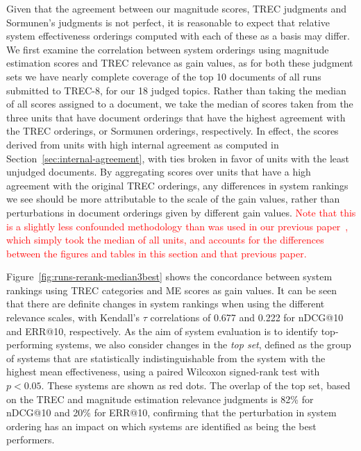Given that the agreement between our magnitude scores, TREC judgments
and Sormunen's judgments is not perfect, it is reasonable to expect
that relative system effectiveness orderings computed with each of
these as a basis may differ.
We first examine the correlation between system orderings using
magnitude estimation scores and TREC relevance as gain values, as for
both these judgment sets we have nearly complete coverage of the top 10
documents of all runs submitted to TREC-8, for our 18 judged topics.
% 
Rather than taking the median of all scores assigned to a document, we
take the median of scores taken from the three units that have document
orderings that have the highest agreement with the TREC orderings, or
Sormunen orderings, respectively.
In effect, the scores derived from units with high internal agreement as
computed in Section~\ref{sec:internal-agreement}, with ties broken in favor
of units with the least unjudged documents.
By aggregating scores over units that have a high agreement with the
original TREC orderings, any differences in system rankings we see should be more
attributable to the scale of the gain values, rather than perturbations in
document orderings given by different gain values.
\textcolor{red}{Note that this is a slightly less confounded methodology 
than was used in our previous paper~\cite{ME-SIGIR15}, which simply took the median 
of all units, and accounts for the 
differences between the figures and tables in this section and 
that previous paper.}

Figure~\ref{fig:runs-rerank-median3best} shows the concordance between
system rankings using TREC categories and ME scores as gain values.
It can be seen that there are definite changes in system rankings when
using the different relevance scales, with Kendall's $\tau$
correlations of 0.677 and 0.222 for nDCG@10 and ERR@10, respectively.
As the aim of system evaluation is to identify top-performing systems,
we also consider changes in the \emph{top set}, defined as the group of
systems that are statistically indistinguishable from the system with
the highest mean effectiveness, using a paired Wilcoxon signed-rank
test with $p<0.05$.
These systems are shown as red dots.
The overlap of the top set, based on the TREC and magnitude estimation
relevance judgments is 82\% for nDCG@10 and 20\% for ERR@10, confirming
that the perturbation in system ordering has an impact on which systems
are identified as being the best performers.

